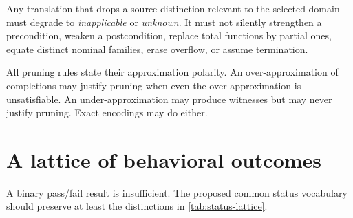 \documentclass[11pt,oneside]{report}
\begin{document}
\begin{failurebox}
Any translation that drops a source distinction relevant to the selected domain must degrade to \emph{inapplicable} or \emph{unknown}. It must not silently strengthen a precondition, weaken a postcondition, replace total functions by partial ones, equate distinct nominal families, erase overflow, or assume termination.
\end{failurebox}

\begin{designrule}
All pruning rules state their approximation polarity. An over-approximation of completions may justify pruning when even the over-approximation is unsatisfiable. An under-approximation may produce witnesses but may never justify pruning. Exact encodings may do either.
\end{designrule}

\section{A lattice of behavioral outcomes}

A binary pass/fail result is insufficient. The proposed common status vocabulary should preserve at least the distinctions in \cref{tab:status-lattice}.
\end{document}
